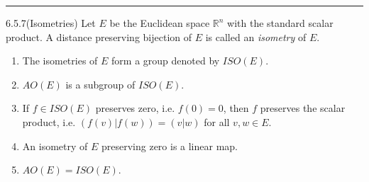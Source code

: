 \documentclass[a4paper, 12pt]{article}
\begin{document}
\noindent\rule{7in}{2.8pt}
\begin{problem}{6.5.7(Isometries)}
Let \(E\) be the Euclidean space \(\mathbb{R}^n\) with the standard scalar product. A distance preserving bijection of \(E\) is called an \textit{isometry} of \(E\). 
\begin{enumerate}
\item The isometries of \(E\) form a group denoted by \(ISO(E)\). 
\item \(AO(E)\) is a subgroup of \(ISO(E)\).
\item If \(f\in ISO(E)\) preserves zero, i.e. \(f(0)=0\), then \(f\) preserves the scalar product, i.e. \((f(v)|f(w))=(v|w)\) for all \(v,w\in E\).
\item An isometry of \(E\) preserving zero is a linear map.
\item \(AO(E)=ISO(E)\).
\end{enumerate}
\end{problem}
\end{document}
